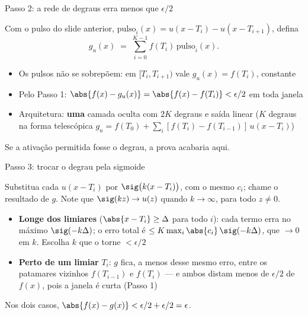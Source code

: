 \documentclass[aspectratio=169, 11pt]{beamer}
\begin{document}
\begin{frame}{Passo 2: a rede de degraus erra menos que $\epsilon/2$}

  Com o pulso do slide anterior,
  $\text{pulso}_i(x) = u(x - T_i) - u(x - T_{i+1})$, defina
  \[
    g_u(x) \;=\; \sum_{i=0}^{K-1} f(T_i)\, \text{pulso}_i(x).
  \]

  \begin{itemize}\setlength{\itemsep}{0.3ex}
    \item Os pulsos não se sobrepõem: em $[T_i, T_{i+1})$ vale
          $g_u(x) = f(T_i)$, constante
    \item Pelo Passo 1: $\abs{f(x) - g_u(x)} = \abs{f(x) - f(T_i)} <
          \epsilon/2$ em toda janela
    \item Arquitetura: \textbf{uma} camada oculta com $2K$ degraus e saída
          linear ($K$ degraus na forma telescópica
          $g_u = f(T_0) + \sum_i [f(T_i) - f(T_{i-1})]\, u(x - T_i)$)
  \end{itemize}

  \smallskip

  \smallskip
  {\small Se a ativação permitida fosse o degrau, a prova acabaria aqui.}
\end{frame}

\begin{frame}{Passo 3: trocar o degrau pela sigmoide}

  Substitua cada $u(x - T_i)$ por $\sig\big(k(x - T_i)\big)$, com o mesmo
  $c_i$; chame o resultado de $g$. Note que
  $\sig(k z) \to u(z)$ quando $k \to \infty$, para todo $z \ne 0$.

  \smallskip
  \begin{itemize}\setlength{\itemsep}{0.3ex}
    \item \textbf{Longe dos limiares} ($\abs{x - T_i} \ge \Delta$ para todo
          $i$): cada termo erra no máximo $\sig(-k\Delta)$; o erro total é
          $\le K \max_i \abs{c_i}\, \sig(-k\Delta)$, que $\to 0$ em $k$.
          Escolha $k$ que o torne $< \epsilon/2$
    \item \textbf{Perto de um limiar} $T_i$: $g$ fica, a menos desse mesmo
          erro, entre os patamares vizinhos $f(T_{i-1})$ e $f(T_i)$ — e
          ambos distam menos de $\epsilon/2$ de $f(x)$, pois a janela é
          curta (Passo 1)
  \end{itemize}

  \smallskip
  Nos dois casos, $\abs{f(x) - g(x)} < \epsilon/2 + \epsilon/2 = \epsilon$.

  \smallskip
\end{frame}
\end{document}
